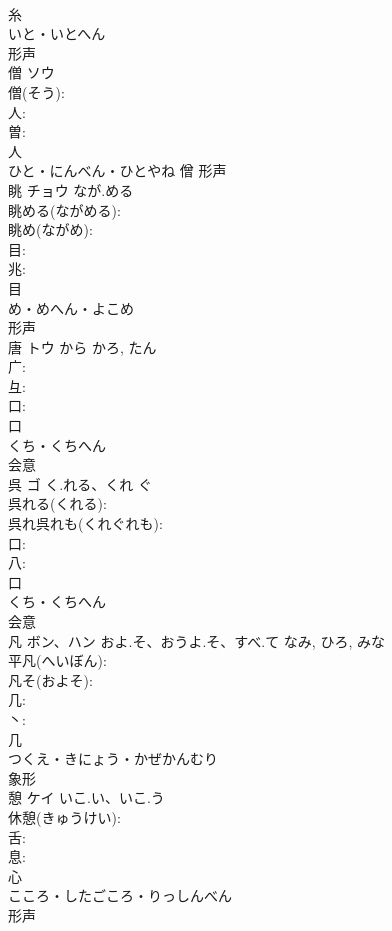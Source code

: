 \documentclass[8pt]{extreport}
\begin{document}
\begin{CJK}{UTF8}{min}
\\	糸	
\\	いと・いとへん	
\\	形声 
\\	僧	ソウ			
\\	僧(そう): 
\\	人: 
\\	曽: 
\\	人	
\\	ひと・にんべん・ひとやね	僧	形声 
\\	眺	チョウ	なが.める		
\\	眺める(ながめる): 
\\	眺め(ながめ): 
\\	目: 
\\	兆: 
\\	目	
\\	め・めへん・よこめ	
\\	形声 
\\	唐	トウ	から	かろ, たん	
\\	广: 
\\	彑: 
\\	口: 
\\	口	
\\	くち・くちへん	
\\	会意 
\\	呉	ゴ	く.れる、くれ	ぐ	
\\	呉れる(くれる): 
\\	呉れ呉れも(くれぐれも): 
\\	口: 
\\	八: 
\\	口	
\\	くち・くちへん	
\\	会意 
\\	凡	ボン、ハン	およ.そ、おうよ.そ、すべ.て	なみ, ひろ, みな	
\\	平凡(へいぼん): 
\\	凡そ(およそ): 
\\	几: 
\\	丶: 
\\	几	
\\	つくえ・きにょう・かぜかんむり	
\\	象形 
\\	憩	ケイ	いこ.い、いこ.う		
\\	休憩(きゅうけい): 
\\	舌: 
\\	息: 
\\	心	
\\	こころ・したごころ・りっしんべん	
\\	形声 

\end{CJK}
\end{document}
